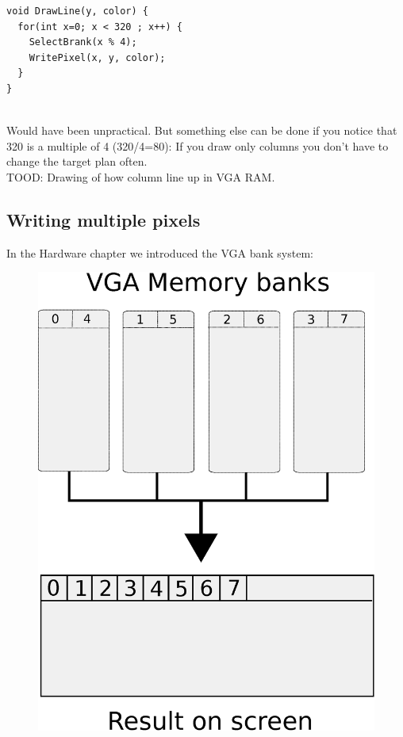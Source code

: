 \documentclass[book.tex]{subfiles}
\begin{document}
\begin{verbatim}
void DrawLine(y, color) {
  for(int x=0; x < 320 ; x++) {
    SelectBrank(x % 4);
    WritePixel(x, y, color);   
  }
}
\end{verbatim}\\
Would have been unpractical. But something else can be done if you notice that 320 is a multiple of 4 (320/4=80): If you draw only columns you don't have to change the target plan often.\\
TOOD: Drawing of how column line up in VGA RAM.\\





\subsection{Writing multiple pixels}
In the Hardware chapter we introduced the VGA bank system:
\begin{figure}[H]
\centering
\includegraphics[scale=0.5]{imgs/vga_ram_screen_layout.eps}
\end{figure}
\end{document}
